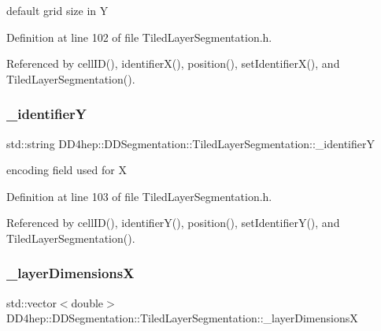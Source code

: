 default grid size in Y 



Definition at line 102 of file Tiled\+Layer\+Segmentation.\+h.



Referenced by cell\+I\+D(), identifier\+X(), position(), set\+Identifier\+X(), and Tiled\+Layer\+Segmentation().

\hypertarget{class_d_d4hep_1_1_d_d_segmentation_1_1_tiled_layer_segmentation_af157c59a13254572f336a345463e993d}{}\label{class_d_d4hep_1_1_d_d_segmentation_1_1_tiled_layer_segmentation_af157c59a13254572f336a345463e993d} 
\subsubsection{\texorpdfstring{\+\_\+identifierY}{\_identifierY}}
{\footnotesize\ttfamily std\+::string D\+D4hep\+::\+D\+D\+Segmentation\+::\+Tiled\+Layer\+Segmentation\+::\+\_\+identifierY\hspace{0.3cm}{\ttfamily [protected]}}



encoding field used for X 



Definition at line 103 of file Tiled\+Layer\+Segmentation.\+h.



Referenced by cell\+I\+D(), identifier\+Y(), position(), set\+Identifier\+Y(), and Tiled\+Layer\+Segmentation().

\hypertarget{class_d_d4hep_1_1_d_d_segmentation_1_1_tiled_layer_segmentation_afd897bc752982287d6184099d6badede}{}\label{class_d_d4hep_1_1_d_d_segmentation_1_1_tiled_layer_segmentation_afd897bc752982287d6184099d6badede} 
\subsubsection{\texorpdfstring{\+\_\+layer\+DimensionsX}{\_layerDimensionsX}}
{\footnotesize\ttfamily std\+::vector$<$double$>$ D\+D4hep\+::\+D\+D\+Segmentation\+::\+Tiled\+Layer\+Segmentation\+::\+\_\+layer\+DimensionsX\hspace{0.3cm}{\ttfamily [protected]}}



